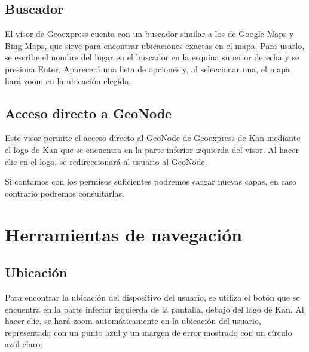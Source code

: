 \documentclass[a4paper,11pt,openany,spanish]{sphinxmanual}
\begin{document}
\subsection{Buscador}
\label{\detokenize{search/search:buscador}}\label{\detokenize{search/search::doc}}

\sphinxAtStartPar
El visor de Geoexpress cuenta con un buscador similar a los de Google Maps y Bing Maps, que sirve para encontrar ubicaciones exactas en el mapa. Para usarlo, se escribe el nombre del lugar en el buscador en la esquina superior derecha y se presiona Enter. Aparecerá una lista de opciones y, al seleccionar una, el mapa hará zoom en la ubicación elegida.

\sphinxstepscope


\subsection{Acceso directo a GeoNode}
\label{\detokenize{search/geonode:acceso-directo-a-geonode}}\label{\detokenize{search/geonode::doc}}
\sphinxAtStartPar
Este visor permite el acceso directo al GeoNode de Geoexpress de Kan  mediante el logo de Kan que se encuentra en la parte inferior izquierda del visor. Al hacer clic en el logo, se redireccionará al usuario al GeoNode.


\sphinxAtStartPar
Si contamos con los permisos suficientes podremos cargar nuevas capas, en caso contrario podremos consultarlas.


\sphinxstepscope


\section{Herramientas de navegación}
\label{\detokenize{tools/index:herramientas-de-navegacion}}\label{\detokenize{tools/index::doc}}
\sphinxstepscope


\subsection{Ubicación}
\label{\detokenize{tools/location:ubicacion}}\label{\detokenize{tools/location::doc}}
\sphinxAtStartPar
Para encontrar la ubicación del dispositivo del usuario, se utiliza el botón que se encuentra en la parte inferior izquierda de la pantalla, debajo del logo de Kan. Al hacer clic, se hará zoom automáticamente en la ubicación del usuario, representada con un punto azul y un margen de error mostrado con un círculo azul claro.
\end{document}
